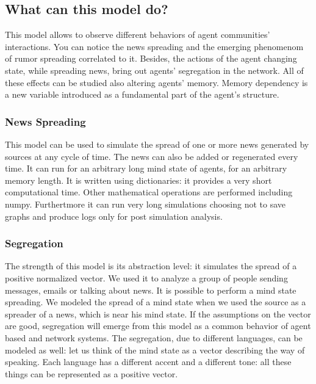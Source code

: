 \subsection{What can this model do?}
This model allows to observe different behaviors of agent communities'
interactions.
You can notice the news spreading and the emerging phenomenom of rumor
spreading correlated to it.
Besides, the actions of the agent changing state, while spreading news, bring
out agents' segregation in the network.
All of these effects can be studied also altering agents' memory.
Memory dependency is a new variable introduced as a fundamental
part of the agent's structure.

\subsubsection{News Spreading}
This model can be used to simulate the spread of one or more news generated
by sources at any cycle of time. The news can also be added or regenerated
every time. It can run for an arbitrary long mind state of agents,
for an arbitrary memory length.
It is written using dictionaries: it provides a very short computational time.
Other mathematical operations are performed including numpy.
Furthertmore it can run very long simulations choosing not to save graphs
and produce logs only for post simulation analysis.

\subsubsection{Segregation}
The strength of this model is its abstraction level: it simulates the
spread of a positive normalized vector.
We used it to analyze a group of people sending messages, emails or
talking about news.
It is possible to perform a mind state spreading.
We modeled the spread of a mind state when we used the source as a spreader
of a news, which is near his mind state.
If the assumptions on the vector are good, segregation will emerge from
this model as a common behavior of agent based and network systems.
The segregation, due to different languages, can be modeled as well:
let us think of the mind state as a vector describing the way of speaking.
Each language has a different accent and a different tone: all these things
can be represented as a positive vector.
